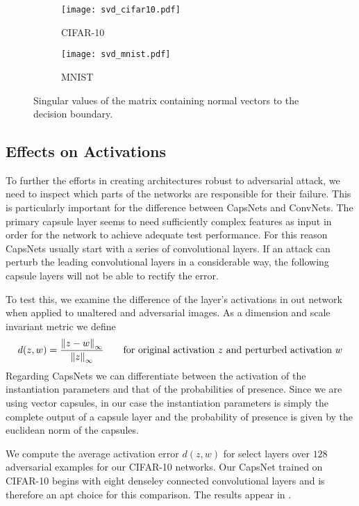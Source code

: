 \begin{figure}
	\centering
	\begin{subfigure}{.5\textwidth}
		\texttt{[image: svd\_cifar10.pdf]}
		\caption{CIFAR-10}
	\end{subfigure}%
	\begin{subfigure}{.5\textwidth}
		\texttt{[image: svd\_mnist.pdf]}
		\caption{MNIST}
	\end{subfigure}
	
	\caption{Singular values of the matrix containing normal vectors to the decision boundary.}
	\label{fig:svd}
\end{figure}

\subsection{Effects on Activations}

To further the efforts in creating architectures robust to adversarial attack, we need to inspect which parts of the networks are responsible for their failure.
This is particularly important for the difference between CapsNets and ConvNets.
The primary capsule layer seems to need sufficiently complex features as input in order for the network to achieve adequate test performance.
For this reason CapsNets usually start with a series of convolutional layers.
If an attack can perturb the leading convolutional layers in a considerable way, the following capsule layers will not be able to rectify the error.

To test this, we examine the difference of the layer's activations in out network when applied to unaltered and adversarial images. As a dimension and scale invariant metric we define
\begin{equation}
	d(z, w) = \frac{\norm[\infty]{z - w}}{\norm[\infty]{z}}
	\qquad \text{for original activation $z$ and perturbed activation $w$}
\end{equation}
Regarding CapsNets we can differentiate between the activation of the instantiation parameters and that of the probabilities of presence. Since we are using vector capsules, in our case the instantiation parameters is simply the complete output of a capsule layer and the probability of presence is given by the euclidean norm of the capsules.

We compute the average activation error $d(z, w)$ for select layers over $128$ adversarial examples for our CIFAR-10 networks. Our CapsNet trained on CIFAR-10 begins with eight denseley connected convolutional layers and is therefore an apt choice for this comparison.
The results appear in .

